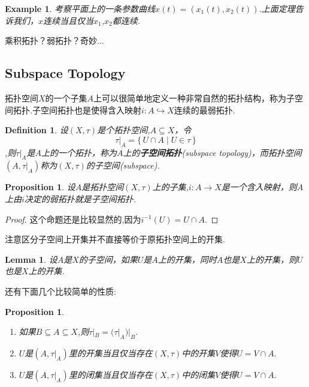\documentclass{article}
\newtheorem{lemma}[theorem]{Lemma}
\newtheorem{proposition}[theorem]{Proposition}
\newtheorem{example}[theorem]{Example}
\newtheorem{definition}[theorem]{Definition}
\newcommand*{\xfunc}[4]{{#2}\colon{#3}{#1}{#4}}
\newcommand*{\func}[3]{\xfunc{\to}{#1}{#2}{#3}}
\newcommand\Set[2]{\{\,#1\mid#2\,\}} %
\begin{document}
\begin{example}
考察平面上的一条参数曲线$x(t)=(x_1(t),x_2(t))$.上面定理告诉我们，$x$连续当且仅当$x_1$,$x_2$都连续.
\end{example}

乘积拓扑？弱拓扑？奇妙...

\newpage
\subsection{Subspace Topology}

拓扑空间$X$的一个子集$A$上可以很简单地定义一种非常自然的拓扑结构，称为子空间拓扑.子空间拓扑也是使得含入映射$i \colon A \hookrightarrow X$连续的最弱拓扑.

\begin{definition}
设$(X,\tau)$是个拓扑空间,$A \subseteq X$，令\[\tau|_A=\Set{U \cap A}{U \in \tau}\],则$\tau|_A$是$A$上的一个拓扑，称为$A$上的\textbf{子空间拓扑}(subspace topology)，而拓扑空间$(A,\tau|_A)$称为$(X,\tau)$的子空间(subspace).
\end{definition}

\begin{proposition}
设$A$是拓扑空间$(X,\tau)$上的子集,$\func{i}{A}{X}$是一个含入映射，则$A$上由$i$决定的弱拓扑就是子空间拓扑.
\end{proposition}

\begin{proof}
这个命题还是比较显然的,因为$i^{-1}(U)=U \cap A$.
\end{proof}

注意区分子空间上开集并不直接等价于原拓扑空间上的开集.

\begin{lemma}
设$A$是$X$的子空间，如果$U$是$A$上的开集，同时$A$也是$X$上的开集，则$U$也是$X$上的开集.
\end{lemma}


还有下面几个比较简单的性质:

\begin{proposition}
\begin{enumerate}
	\item 如果$B \subseteq A \subseteq X$,则$\tau|_B = (\tau|_A)|_B.$
	\item $U$是$(A,\tau|_A)$里的开集当且仅当存在$(X,\tau)$中的开集$V$使得$U = V \cap A.$
	\item $U$是$(A,\tau|_A)$里的闭集当且仅当存在$(X,\tau)$中的闭集$V$使得$U = V \cap A.$
\end{enumerate}
\end{proposition}
\end{document}
